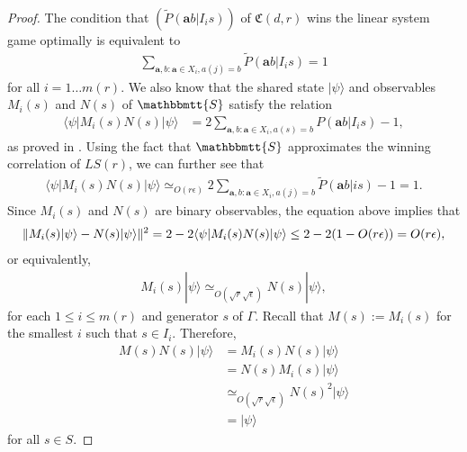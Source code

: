 \documentclass[11pt,letterpaper]{article}
\newcommand{\ket}[1]{|#1\rangle}
\newcommand{\bra}[1]{\langle#1|}
\DeclarePairedDelimiter{\norm}{\lVert}{\rVert}
\newcommand{\1}{\mathbb{1}}
\newcommand{\LS}{LS}
\newcommand{\mr}{m(r)}
\newcommand{\fC}{\mathfrak{C}}
\newcommand{\ba}{\pmb{a}}
\newcommand{\bS}{\mathbbmtt{S}}
\newcommand{\pr}[2]{P(#1|#2)}
\newcommand{\tpr}[2]{\tilde{P}(#1|#2)}
\newcommand{\ep}{\epsilon}
\newcommand{\se}{\sqrt{\epsilon}}
\newcommand{\sr}{\sqrt{r}}
\newcommand{\appd}[1]{\simeq_{#1}}
\theoremstyle{definition}
\begin{document}
\begin{proof}
The condition that $(\tpr{\ba b}{I_i s})$ of $\fC(d,r)$ wins the linear system game optimally is equivalent to
\begin{align*}
\sum_{\ba,b: \ba \in X_i, a(j) = b} \tpr{\ba b}{I_i s} = 1
\end{align*}
for all $i = 1 \dots \mr$.
We also know that the shared state $\ket{\psi}$ and observables $M_i(s)$
and $N(s)$ of $\bS$ satisfy the relation
\begin{align*}
	\bra{\psi} M_i(s) N(s) \ket{\psi} &= 2 \sum_{\ba,b: \ba \in X_i, a(s) = b} \pr{\ba b}{I_i s} -1,
\end{align*}
as proved in \cite{slofstra2017}.
Using the fact that $\bS$ approximates the winning correlation of $\LS(r)$, 
we can further see that
\begin{align*}
	\bra{\psi} M_i(s) N(s) \ket{\psi} \appd{O(r \ep)} 2\sum_{\ba,b: \ba \in X_i, a(j) = b} \tpr{\ba b}{is} - 1 = 1.
\end{align*}
Since $M_i(s)$ and $N(s)$ are binary observables, the equation above
implies that
\begin{align*}
    \norm{M_i(s)\ket{\psi} - N(s)\ket{\psi}}^2 
    = 2 - 2 \bra{\psi}M_i(s)N(s) \ket{\psi} 
    \leq 2 - 2(1 - O(r\ep)) = O(r\ep),
\end{align*}
or equivalently,
\begin{align*}
	M_{i}(s) \ket{\psi} \appd{O(\sr\se)} N(s) \ket{\psi},
\end{align*}
for each $1 \leq i \leq \mr$ and generator $s$ of
$\Gamma$.
Recall that $M(s) := M_{i}(s)$ for the smallest $i$ such that $ s \in I_i$.
Therefore, 
\begin{align*}
	M(s) N(s) \ket{\psi} & = M_{i}(s)N(s)\ket{\psi} \\
	    & = N(s) M_{i}(s) \ket{\psi} \\
	    &\appd{O(\sr\se)} N(s)^2 \ket{\psi} \\
	    &= \ket{\psi}
\end{align*}
for all $s \in S$.  


\end{proof}
\end{document}
